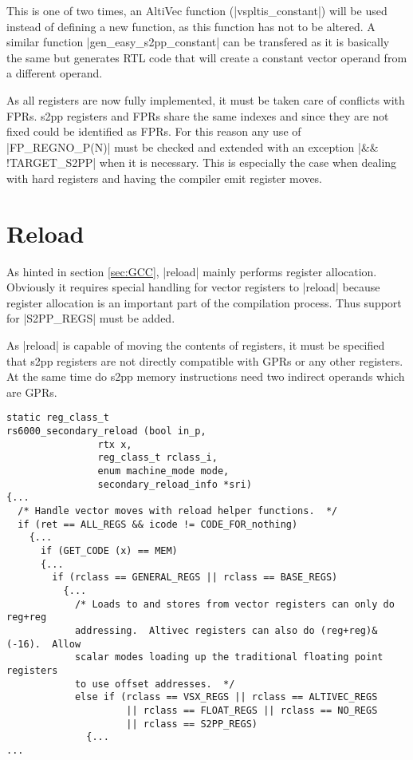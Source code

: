 This is one of two times, an AltiVec function (|vspltis_constant|) will be used instead of defining a new function, as this function has not to be altered.
A similar function |gen_easy_s2pp_constant| can be transfered as it is basically the same but generates \ac{RTL} code that will create a constant vector operand from a different operand.

As all registers are now fully implemented, it must be taken care of conflicts with \acp{FPR}.
\ac{s2pp} registers and \acp{FPR} share the same indexes and since they are not fixed could be identified as \acp{FPR}.
For this reason any use of |FP_REGNO_P(N)| must be checked and extended with an exception |&& !TARGET_S2PP| when it is necessary.
This is especially the case when dealing with hard registers and having the compiler emit register moves.

\section{Reload}
As hinted in section \ref{sec:GCC}, |reload| mainly performs register allocation.
Obviously it requires special handling for vector registers to |reload| because register allocation is an important part of the compilation process.
Thus support for |S2PP_REGS| must be added.

As |reload| is capable of moving the contents of registers, it must be specified that \ac{s2pp} registers are not directly compatible with GPRs or any other registers.
At the same time do \ac{s2pp} memory instructions need two indirect operands which are \acp{GPR}.
\begin{lstlisting}
static reg_class_t
rs6000_secondary_reload (bool in_p,
                rtx x,
                reg_class_t rclass_i,
                enum machine_mode mode,
                secondary_reload_info *sri)
{...
  /* Handle vector moves with reload helper functions.  */
  if (ret == ALL_REGS && icode != CODE_FOR_nothing)
    {...
      if (GET_CODE (x) == MEM)
      {...
        if (rclass == GENERAL_REGS || rclass == BASE_REGS)
          {...
            /* Loads to and stores from vector registers can only do reg+reg
            addressing.  Altivec registers can also do (reg+reg)&(-16).  Allow
            scalar modes loading up the traditional floating point registers
            to use offset addresses.  */
            else if (rclass == VSX_REGS || rclass == ALTIVEC_REGS
                     || rclass == FLOAT_REGS || rclass == NO_REGS
                     || rclass == S2PP_REGS)
              {...
...
\end{lstlisting}


